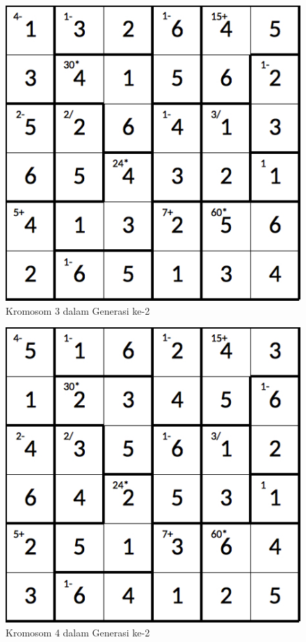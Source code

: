 \begin{figure}
\centering
\captionsetup{justification=centering}
\includegraphics[scale=0.333]{Gambar/hybridgenetic/Generation2Chromosome3}
\caption[Kromosom 3 dalam Generasi ke-2]{Kromosom 3 dalam Generasi ke-2}
\label{fig:analisisg2k3}
\end{figure}

\begin{figure}
\centering
\captionsetup{justification=centering}
\includegraphics[scale=0.333]{Gambar/hybridgenetic/Generation2Chromosome4}
\caption[Kromosom 4 dalam Generasi ke-2]{Kromosom 4 dalam Generasi ke-2}
\label{fig:analisisg2k4}
\end{figure}

